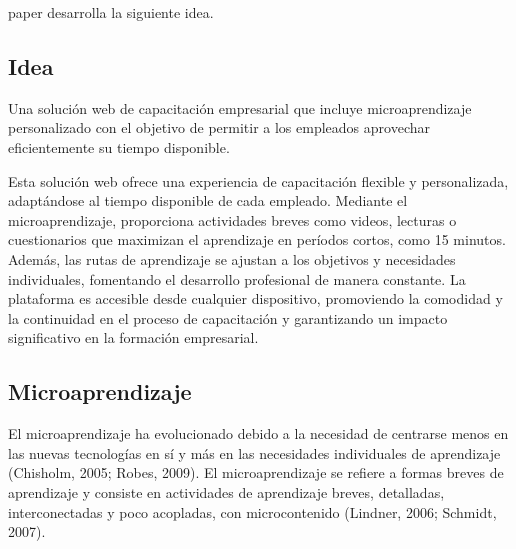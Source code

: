  paper desarrolla la siguiente idea.

\subsection{Idea}
Una solución web de capacitación empresarial que incluye microaprendizaje personalizado con el objetivo de permitir
a los empleados aprovechar eficientemente su tiempo disponible.

Esta solución web ofrece una experiencia de capacitación flexible y personalizada,
adaptándose al tiempo disponible de cada empleado.
Mediante el microaprendizaje, proporciona actividades breves como videos,
lecturas o cuestionarios que maximizan el aprendizaje en períodos cortos,
como 15 minutos. Además, las rutas de aprendizaje se ajustan a los objetivos y necesidades individuales,
fomentando el desarrollo profesional de manera constante. La plataforma es accesible desde cualquier dispositivo,
promoviendo la comodidad y la continuidad en el proceso de capacitación y garantizando un impacto significativo en la
formación empresarial.

\subsection{Microaprendizaje}
El microaprendizaje ha evolucionado debido a la necesidad de centrarse menos en las nuevas tecnologías en sí y más en
las necesidades individuales de aprendizaje (Chisholm, 2005; Robes, 2009). El microaprendizaje se refiere a formas breves
de aprendizaje y consiste en actividades de aprendizaje breves, detalladas, interconectadas y poco acopladas,
con microcontenido (Lindner, 2006; Schmidt, 2007).
\cite{article:microlearning_buchem}


